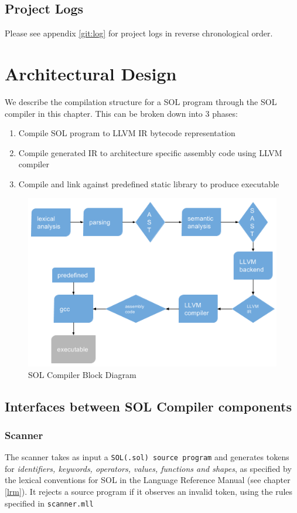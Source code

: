 \documentclass[letterpaper,12pt]{report}
\begin{document}
  \section {Project Logs}
  Please see appendix \ref{git:log} for project logs in reverse chronological order.

\chapter{Architectural Design}
  We describe the compilation structure for a SOL program through the SOL compiler in this chapter. This can be broken down into 3 phases:
  \begin{enumerate}
    \itemsep 0em

    \item Compile SOL program to LLVM IR bytecode representation
    \item Compile generated IR to architecture specific assembly code using LLVM compiler
    \item Compile and link against predefined static library to produce executable
  \end{enumerate}

  \begin{figure}[ht]
    \includegraphics[scale=1]{compile-architecture.png}
    \caption{SOL Compiler Block Diagram}
  \end{figure}

  \section{Interfaces between SOL Compiler components}
    \subsection{Scanner}
      The scanner takes as input a \texttt{SOL(.sol) source program} and generates tokens for \textit{identifiers, keywords, operators, values, functions and shapes}, as specified by the lexical conventions for SOL in the Language Reference Manual (see chapter \ref{lrm}). It rejects a source program if it observes an invalid token, using the rules specified in \texttt{scanner.mll}
\end{document}
